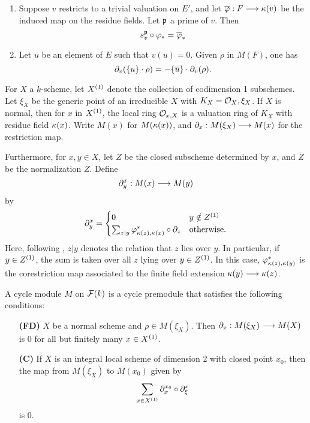 \begin{defn}
\begin{enumerate}[label=\bfseries R3\alph*., leftmargin=3em]
\item Suppose $v$ restricts to a trivial valuation 
on $E'$, and let $\phib: F \to \resf{v}$ be the induced map on 
the residue fields. Let $\ideal{p}$ a prime of $v$. Then
\[
\Special{v}{\ideal{p}} \comp \phi_* = \phib_*
\]

\item Let $u$ be an element of $E$ such that 
$v(u) = 0$. Given $\rho$ in $M(F)$, one has
\[
\res{v}(\{u\} \cdot \rho) = -\{\overline{u}\} \cdot \res{v}(\rho).
\]
\end{enumerate}
\end{defn}

For $X$ a $k$-scheme, let $\subsch{1}{X}$ denote the collection of 
codimension 1 subschemes. Let $\xi_X$ be the generic point of an
irreducible $X$ with $K_X = \O_X,\xi_X$. If $X$ is normal, then 
for $x$ in $\subsch{1}{X}$, the local ring $\O_{x,X}$ is a valuation 
ring of $K_X$ with residue field $\resf{x}$. Write $M(x)$ for 
$M(\resf{x})$, and $\res{x}: M(\xi_X) \to M(x)$ for the 
restriction map.

Furthermore, for $x, y \in X$, let $Z$ be the closed subscheme 
determined by $x$, and $\overline{Z}$ be the normalization $Z$.
Define
\[
\ptres{x}{y}: M(x) \to M(y)
\]
by
\[
\ptres{x}{y} = 
\begin{cases}
0 & y \notin \subsch{1}{Z} \\
\sum_{z|y} \phi_{\resf{z},\resf{x}}^* \comp \res{z} & \textrm{otherwise}.
\end{cases}
\]
Here, following \cite{Rost96}, $z|y$ denotes the relation that $z$ 
lies over $y$. In particular, if $y \in \subsch{1}{Z}$, the sum 
is taken over all $z$ lying over $y \in \subsch{1}{Z}$. In this
case, $\phi_{\resf{z},\resf{y}}^*$ is the corestriction map 
associated to the finite field extension $\resf{y} \to \resf{z}$.

\begin{defn}
A cycle module $M$ on $\fields(\basefield)$ is a cycle premodule that
satisfies the following conditions:

\begin{enumerate}[leftmargin=3em]
\item[\textbf{(FD)}]  
$X$ be a normal scheme and $\rho \in M(\xi_X)$. Then $\res{x}: 
M(\xi_X) \to M(X)$ is 0 for all but finitely many $x \in 
\subsch{1}{X}$.

\item[\textbf{(C)}]  If $X$ is an integral
local scheme of dimension 2 with closed point $x_0$, then the map 
from $M(\xi_X)$ to $M(x_0)$ given by
\[
\sum_{x \in \subsch{1}{X}} \ptres{x_0}{x} \comp \ptres{x}{\xi}
\]
is 0.
\end{enumerate}
\end{defn}

